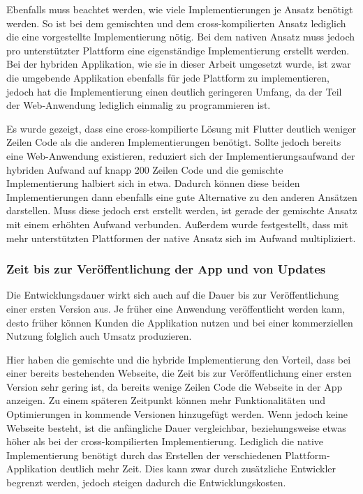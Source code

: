 Ebenfalls muss beachtet werden, wie viele Implementierungen je Ansatz benötigt werden. So ist bei dem gemischten und dem cross-kompilierten Ansatz lediglich die eine vorgestellte Implementierung nötig. Bei dem nativen Ansatz muss jedoch pro unterstützter Plattform eine eigenständige Implementierung erstellt werden. Bei der hybriden Applikation, wie sie in dieser Arbeit umgesetzt wurde, ist zwar die umgebende Applikation ebenfalls für jede Plattform zu implementieren, jedoch hat die Implementierung einen deutlich geringeren Umfang, da der Teil der Web-Anwendung lediglich einmalig zu programmieren ist.  

Es wurde gezeigt, dass eine cross-kompilierte Lösung mit Flutter deutlich weniger Zeilen Code als die anderen Implementierungen benötigt.
Sollte jedoch bereits eine Web-Anwendung existieren, reduziert sich der Implementierungsaufwand der hybriden Aufwand auf knapp 200 Zeilen Code und die gemischte Implementierung halbiert sich in etwa. Dadurch können diese beiden Implementierungen dann ebenfalls eine gute Alternative zu den anderen Ansätzen darstellen. Muss diese jedoch erst erstellt werden, ist gerade der gemischte Ansatz mit einem erhöhten Aufwand verbunden. Außerdem wurde festgestellt, dass mit mehr unterstützten Plattformen der native Ansatz sich im Aufwand multipliziert.

\subsubsection{Zeit bis zur Veröffentlichung der App und von Updates }
Die Entwicklungsdauer wirkt sich auch auf die Dauer bis zur Veröffentlichung einer ersten Version aus.
Je früher eine Anwendung veröffentlicht werden kann, desto früher können Kunden die Applikation nutzen und bei einer kommerziellen Nutzung folglich auch Umsatz produzieren.

Hier haben die gemischte und die hybride Implementierung den Vorteil, dass bei einer bereits bestehenden Webseite, die Zeit bis zur Veröffentlichung einer ersten Version sehr gering ist, da bereits wenige Zeilen Code die Webseite in der App anzeigen. Zu einem späteren Zeitpunkt können mehr Funktionalitäten und Optimierungen in kommende Versionen hinzugefügt werden. Wenn jedoch keine Webseite besteht, ist die anfängliche Dauer vergleichbar, beziehungsweise etwas höher als bei der cross-kompilierten Implementierung. Lediglich die native Implementierung benötigt durch das Erstellen der verschiedenen Plattform-Applikation deutlich mehr Zeit. Dies kann zwar durch zusätzliche Entwickler begrenzt werden, jedoch steigen dadurch die Entwicklungskosten.

